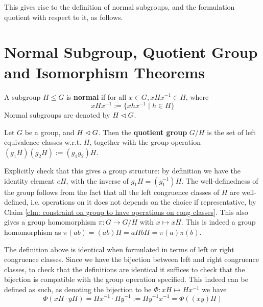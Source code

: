 \documentclass{article}
\begin{document}
\textstart
This gives rise to the definition of normal subgroups, and the formulation quotient with respect to it, as follows.

\section{Normal Subgroup, Quotient Group and Isomorphism Theorems}

\begin{definition}
    A subgroup $H \leq G$ is \textbf{normal} if for all $x \in G, xHx^{-1} \in H$, where
    \[
        xHx^{-1} := \{ xhx^{-1} \mid h \in H \}
    \]
    Normal subgroups are denoted by $H \lhd G$.
\end{definition}

\begin{definition}
    Let $G$ be a group, and $H \lhd G$. Then the \textbf{quotient group} $G/H$ is the set of left equivalence classes w.r.t. $H$, together with the group operation $(g_1 H)(g_2 H) := (g_1 g_2) H$.
\end{definition}

\begin{remark}\label{rmk: projection to quotient}
    Explicitly check that this gives a group structure: by definition we have the identity element $eH$, with the inverse of $g_1 H = (g_1^{-1})H$. The well-definedness of the group follows from the fact that all the left congruence classes of $H$ are well-defined, i.e. operations on it does not depends on the choice if representative, by Claim \ref{clm: constraint on group to have operations on cong classes}. This also gives a group homomorphism $\pi: G \to G/H$ with $x \mapsto xH$. This is indeed a group homomorphism as $\pi(ab) = (ab) H = aH bH = \pi(a) \pi(b)$. 
\end{remark}
    
\begin{remark}
    The definition above is identical when formulated in terms of left or right congruence classes. Since we have the bijection between left and right congruence classes, to check that the definitions are identical it suffices to check that the bijection is compatible with the group operation specified. This indeed can be defined as such, as denoting the bijection to be $\Phi: xH \mapsto Hx^{-1}$ we have
    \[
        \Phi(xH \cdot yH) = Hx^{-1} \cdot Hy^{-1} := H y^{-1} x^{-1} = \Phi((xy) H)
    \]
\end{remark}
\end{document}
